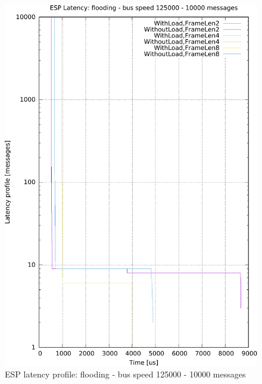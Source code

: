 \documentclass{ctuthesis}
\begin{document}
\begin{figure}[htb]
\includegraphics[width=\linewidth]{figures/speed125000_messages10000_floodTrue.pdf}
\caption{ESP latency profile: flooding - bus speed 125000 - 10000 messages}
\end{figure}
\end{document}
